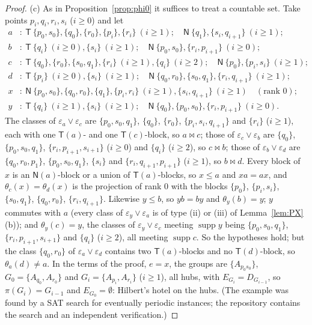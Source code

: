 \documentclass[11pt]{amsart}
\theoremstyle{definition}
\newcommand{\supp}{\operatorname{supp}}
\newcommand{\T}{\mathsf{T}}
\newcommand{\N}{\mathsf{N}}
\newcommand{\mt}{\bowtie}      %
\begin{document}
\begin{proof}
(c) As in Proposition~\ref{prop:phi0} it suffices to treat a countable set. Take points $p_i,q_i,r_i,s_i$ ($i\ge0$) and let
\begin{align*}
a&:\ \T\ \{p_0,s_0\},\{q_0\},\{r_0\},\{p_i\},\{r_i\}\ (i\ge1);\quad \N\ \{q_1\},\{s_i,q_{i+1}\}\ (i\ge1);\\
b&:\ \T\ \{q_i\}\ (i\ge0),\{s_i\}\ (i\ge1);\quad \N\ \{p_0,s_0\},\{r_i,p_{i+1}\}\ (i\ge0);\\
c&:\ \T\ \{q_0\},\{r_0\},\{s_0,q_1\},\{r_i\}\ (i\ge1),\{q_i\}\ (i\ge2);\quad \N\ \{p_0\},\{p_i,s_i\}\ (i\ge1);\\
d&:\ \T\ \{p_i\}\ (i\ge0),\{s_i\}\ (i\ge1);\quad \N\ \{q_0,r_0\},\{s_0,q_1\},\{r_i,q_{i+1}\}\ (i\ge1);\\
x&:\ \N\ \{p_0,s_0\},\{q_0,r_0\},\{q_1\},\{p_i,r_i\}\ (i\ge1),\{s_i,q_{i+1}\}\ (i\ge1)\quad(\text{rank }0);\\
y&:\ \T\ \{q_i\}\ (i\ge1),\{s_i\}\ (i\ge1);\quad \N\ \{q_0\},\{p_0,s_0\},\{r_i,p_{i+1}\}\ (i\ge0).
\end{align*}
The classes of $\varepsilon_a\vee\varepsilon_c$ are $\{p_0,s_0,q_1\}$, $\{q_0\}$, $\{r_0\}$, $\{p_i,s_i,q_{i+1}\}$ and $\{r_i\}$ ($i\ge1$), each with one $\T(a)$- and one $\T(c)$-block, so $a\mt c$; those of $\varepsilon_c\vee\varepsilon_b$ are $\{q_0\}$, $\{p_0,s_0,q_1\}$, $\{r_i,p_{i+1},s_{i+1}\}$ ($i\ge0$) and $\{q_i\}$ ($i\ge2$), so $c\mt b$; those of $\varepsilon_b\vee\varepsilon_d$ are $\{q_0,r_0,p_1\}$, $\{p_0,s_0,q_1\}$, $\{s_i\}$ and $\{r_i,q_{i+1},p_{i+1}\}$ ($i\ge1$), so $b\mt d$. Every block of $x$ is an $\N(a)$-block or a union of $\T(a)$-blocks, so $x\le a$ and $xa=ax$, and $\theta_c(x)=\theta_d(x)$ is the projection of rank $0$ with the blocks $\{p_0\}$, $\{p_i,s_i\}$, $\{s_0,q_1\}$, $\{q_0,r_0\}$, $\{r_i,q_{i+1}\}$. Likewise $y\le b$, so $yb=by$ and $\theta_y(b)=y$; $y$ commutes with $a$ (every class of $\varepsilon_y\vee\varepsilon_a$ is of type (ii) or (iii) of Lemma~\ref{lem:PX}(b)); and $\theta_y(c)=y$, the classes of $\varepsilon_y\vee\varepsilon_c$ meeting $\supp y$ being $\{p_0,s_0,q_1\}$, $\{r_i,p_{i+1},s_{i+1}\}$ and $\{q_i\}$ ($i\ge2$), all meeting $\supp c$. So the hypotheses hold; but the class $\{q_0,r_0\}$ of $\varepsilon_a\vee\varepsilon_d$ contains two $\T(a)$-blocks and no $\T(d)$-block, so $\theta_a(d)\ne a$. In the terms of the proof, $e=x$, the groups are $\{A_{p_0s_0}\}$, $G_0=\{A_{q_0},A_{r_0}\}$ and $G_i=\{A_{p_i},A_{r_i}\}$ ($i\ge1$), all hubs, with $E_{G_i}=D_{G_{i-1}}$, so $\pi(G_i)=G_{i-1}$ and $E_{G_0}=\emptyset$: Hilbert's hotel on the hubs. (The example was found by a SAT search for eventually periodic instances; the repository contains the search and an independent verification.)
\end{proof}
\end{document}
